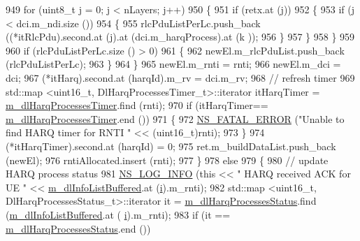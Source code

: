 \begin{DoxyCode}
949               \textcolor{keywordflow}{for} (uint8\_t j = 0; j < nLayers; j++)
950                 \{
951                   \textcolor{keywordflow}{if} (retx.at (j))
952                     \{
953                       \textcolor{keywordflow}{if} (j < dci.m\_ndi.size ())
954                         \{
955                           rlcPduListPerLc.push\_back ((*itRlcPdu).second.at (j).at (dci.m\_harqProcess).at (k
      ));
956                         \}
957                     \}
958                 \}
959 
960               \textcolor{keywordflow}{if} (rlcPduListPerLc.size () > 0)
961                 \{
962                   newEl.m\_rlcPduList.push\_back (rlcPduListPerLc);
963                 \}
964             \}
965           newEl.m\_rnti = rnti;
966           newEl.m\_dci = dci;
967           (*itHarq).second.at (harqId).m\_rv = dci.m\_rv;
968           \textcolor{comment}{// refresh timer}
969           std::map <uint16\_t, DlHarqProcessesTimer\_t>::iterator itHarqTimer = 
      \hyperlink{classns3_1_1TdMtFfMacScheduler_aa83d8f55bde8ea32e73820ad50ba2821}{m\_dlHarqProcessesTimer}.find (rnti);
970           \textcolor{keywordflow}{if} (itHarqTimer== \hyperlink{classns3_1_1TdMtFfMacScheduler_aa83d8f55bde8ea32e73820ad50ba2821}{m\_dlHarqProcessesTimer}.end ())
971             \{
972               \hyperlink{group__fatal_ga5131d5e3f75d7d4cbfd706ac456fdc85}{NS\_FATAL\_ERROR} (\textcolor{stringliteral}{"Unable to find HARQ timer for RNTI "} << (uint16\_t)rnti);
973             \}
974           (*itHarqTimer).second.at (harqId) = 0;
975           ret.m\_buildDataList.push\_back (newEl);
976           rntiAllocated.insert (rnti);
977         \}
978       \textcolor{keywordflow}{else}
979         \{
980           \textcolor{comment}{// update HARQ process status}
981           \hyperlink{group__logging_gafbd73ee2cf9f26b319f49086d8e860fb}{NS\_LOG\_INFO} (\textcolor{keyword}{this} << \textcolor{stringliteral}{" HARQ received ACK for UE "} << 
      \hyperlink{classns3_1_1TdMtFfMacScheduler_a4237ad4223d377a1c9963a904acbe4ad}{m\_dlInfoListBuffered}.at (\hyperlink{bernuolliDistribution_8m_a6f6ccfcf58b31cb6412107d9d5281426}{i}).m\_rnti);
982           std::map <uint16\_t, DlHarqProcessesStatus\_t>::iterator it = 
      \hyperlink{classns3_1_1TdMtFfMacScheduler_a4f261a098821d6cb892196a257595cb2}{m\_dlHarqProcessesStatus}.find (\hyperlink{classns3_1_1TdMtFfMacScheduler_a4237ad4223d377a1c9963a904acbe4ad}{m\_dlInfoListBuffered}.at (
      \hyperlink{bernuolliDistribution_8m_a6f6ccfcf58b31cb6412107d9d5281426}{i}).m\_rnti);
983           \textcolor{keywordflow}{if} (it == \hyperlink{classns3_1_1TdMtFfMacScheduler_a4f261a098821d6cb892196a257595cb2}{m\_dlHarqProcessesStatus}.end ())

\end{DoxyCode}
